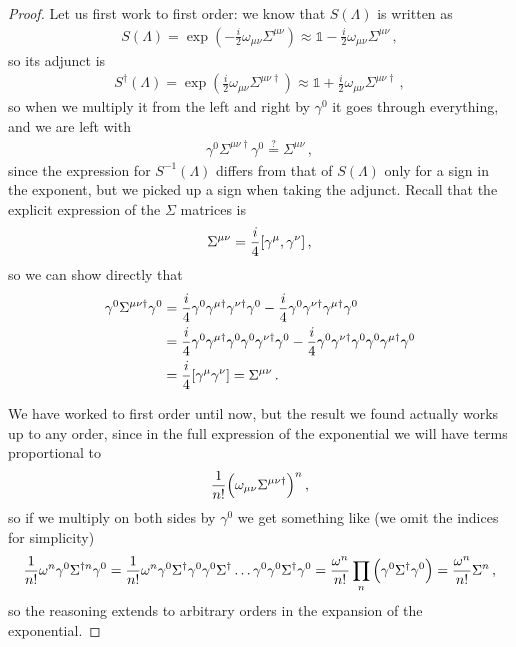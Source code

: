 \documentclass[main.tex]{subfiles}
\begin{document}
\begin{proof}
Let us first work to first order: 
we know that \(S(\Lambda )\) is written as 
%
\begin{align}
S(\Lambda )=   \exp( -\frac{i}{2} \omega_{\mu \nu } \Sigma^{\mu \nu })
\approx \mathbb{1} - \frac{i}{2} \omega_{\mu \nu } \Sigma^{\mu \nu }
\,,
\end{align}
%
so its adjunct is 
%
\begin{align}
S ^\dag (\Lambda ) = \exp( \frac{i}{2} \omega_{\mu \nu } \Sigma^{\mu \nu \dag}) \approx \mathbb{1} + \frac{i}{2} \omega_{\mu \nu } \Sigma^{\mu \nu \dag}
\,,
\end{align}
%
so when we multiply it from the left and right by \(\gamma^{0}\) it goes through everything, and we are left with 
%
\begin{align}
\gamma^{0} \Sigma^{\mu \nu \dag} \gamma^{0} \overset{?}{=} 
\Sigma^{\mu \nu }
\,,
\end{align}
%
since the expression for \(S^{-1}(\Lambda )\) differs from that of \(S(\Lambda )\) only for a sign in the exponent, but we picked up a sign when taking the adjunct. 
Recall that the explicit expression of the \(\Sigma \) matrices is 
%
\begin{align}
\Sigma^{\mu \nu } = \frac{i}{4} \qty[\gamma^{\mu }, \gamma^{\nu }]
\,,
\end{align}
%
so we can show directly that 
%
\begin{subequations}
\begin{align}
\gamma^{0} \Sigma^{\mu \nu \dag} \gamma^{0} &=
\frac{i}{4} \gamma^{0} \gamma^{\mu \dag}  \gamma^{\nu\dag } \gamma^{0 }
-\frac{i}{4} \gamma^{0} \gamma^{\nu\dag }  \gamma^{\mu \dag} \gamma^{0 } \\
&= 
\frac{i}{4} \gamma^{0} \gamma^{\mu \dag} \gamma^{0} \gamma^{0} \gamma^{\nu\dag } \gamma^{0 }
-\frac{i}{4} \gamma^{0} \gamma^{\nu\dag }  \gamma^{0} \gamma^{0} \gamma^{\mu \dag} \gamma^{0 }  \\
&= \frac{i}{4} \qty[\gamma^{\mu } \gamma^{\nu }] = \Sigma^{\mu \nu }
\,.
\end{align}
\end{subequations}

We have worked to first order until now, but the result we found actually works up to any order, since in the full expression of the exponential we will have terms proportional to 
%
\begin{align}
\frac{1}{n!} \qty(\omega_{\mu \nu } \Sigma^{\mu \nu \dag})^{n}
\,,
\end{align}
%
so if we multiply on both sides by \(\gamma^{0}\) we get something like (we omit the indices for simplicity) 
%
\begin{align}
\frac{1}{n!} \omega^{n} \gamma^{0} \Sigma^{\dag n} \gamma^{0} = 
\frac{1}{n!} \omega^{n} \gamma^{0} \Sigma^\dag \gamma^{0} \gamma^{0} \Sigma^\dag  \dots \gamma^{0} \gamma^{0} \Sigma^\dag \gamma^{0} =
\frac{\omega^{n}}{n!}\prod_{n} \qty(\gamma^{0} \Sigma^{\dag} \gamma^{0}) 
= \frac{\omega^{n}}{n!} \Sigma^{n}
\,,
\end{align}
%
so the reasoning extends to arbitrary orders in the expansion of the exponential. 
\end{proof}
\end{document}
